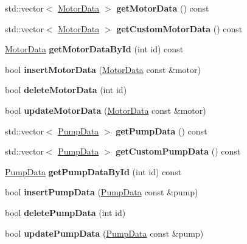 \begin{DoxyCompactItemize}
\mbox{\label{class_s_q_lite_a654ac1320d5629702346f55f99a648c9}} 
std\+::vector$<$ \hyperlink{class_motor_data}{Motor\+Data} $>$ {\bfseries get\+Motor\+Data} () const
\item 
\mbox{\label{class_s_q_lite_a40f0107a78cdb8d735242d954da87ac7}} 
std\+::vector$<$ \hyperlink{class_motor_data}{Motor\+Data} $>$ {\bfseries get\+Custom\+Motor\+Data} () const
\item 
\mbox{\label{class_s_q_lite_a4b0a99992e2909216b40dc499c86a028}} 
\hyperlink{class_motor_data}{Motor\+Data} {\bfseries get\+Motor\+Data\+By\+Id} (int id) const
\item 
\mbox{\label{class_s_q_lite_a38eb0f1501e0918c267a9ab3a0953a54}} 
bool {\bfseries insert\+Motor\+Data} (\hyperlink{class_motor_data}{Motor\+Data} const \&motor)
\item 
\mbox{\label{class_s_q_lite_ab1f59cd24e3931970bc39079b0a5e612}} 
bool {\bfseries delete\+Motor\+Data} (int id)
\item 
\mbox{\label{class_s_q_lite_a7909128eed1b0612ecdf7c50edf1426a}} 
bool {\bfseries update\+Motor\+Data} (\hyperlink{class_motor_data}{Motor\+Data} const \&motor)
\item 
\mbox{\label{class_s_q_lite_ad203543a646b1171cb8e680c295976eb}} 
std\+::vector$<$ \hyperlink{class_pump_data}{Pump\+Data} $>$ {\bfseries get\+Pump\+Data} () const
\item 
\mbox{\label{class_s_q_lite_abcbdd4e6b7ddedd91fd6dcaa62b97696}} 
std\+::vector$<$ \hyperlink{class_pump_data}{Pump\+Data} $>$ {\bfseries get\+Custom\+Pump\+Data} () const
\item 
\mbox{\label{class_s_q_lite_a3ef7e31ae397704e54802d441ee93ef4}} 
\hyperlink{class_pump_data}{Pump\+Data} {\bfseries get\+Pump\+Data\+By\+Id} (int id) const
\item 
\mbox{\label{class_s_q_lite_a88f4b584c569fbab361b9ee1418117a8}} 
bool {\bfseries insert\+Pump\+Data} (\hyperlink{class_pump_data}{Pump\+Data} const \&pump)
\item 
\mbox{\label{class_s_q_lite_a1efbc9694699b16250b8510791bfc2db}} 
bool {\bfseries delete\+Pump\+Data} (int id)
\item 
\mbox{\label{class_s_q_lite_a5b7471c6eff2fd62ab2d465dd85e0768}} 
bool {\bfseries update\+Pump\+Data} (\hyperlink{class_pump_data}{Pump\+Data} const \&pump)
\end{DoxyCompactItemize}


